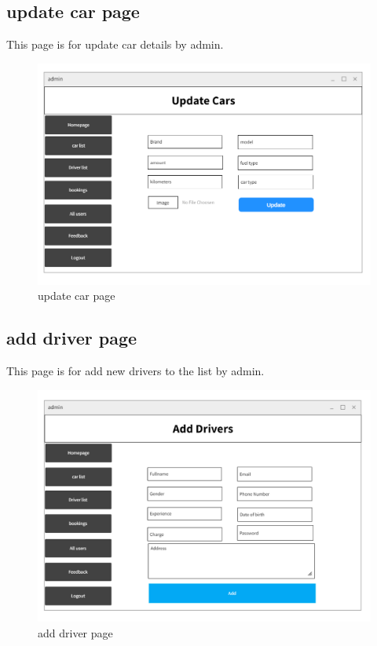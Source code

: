 \documentclass[a4paper,12pt,toc=flat]{report}
\begin{document}
	\pagebreak
	
	
	
	\subsection{update car page}
\hspace*{12pt}
	This page is for update car details by admin.
	\begin{figure}[bph]
	\begin{center}
		\includegraphics[width=1.1 \linewidth, height=0.7\textheight]{"admin_update_car.png"}
	\end{center}
		\caption{update car page}
	\end{figure}

	\pagebreak
	
	\subsection{add driver page}
\hspace*{12pt}
	This page is for add new drivers to the list by admin.
	\begin{figure}[bph]
	\begin{center}
		\includegraphics[width=1.1 \linewidth, height=0.7\textheight]{"add_driver.png"}
	\end{center}
		\caption{add driver page}
	\end{figure}
\end{document}
